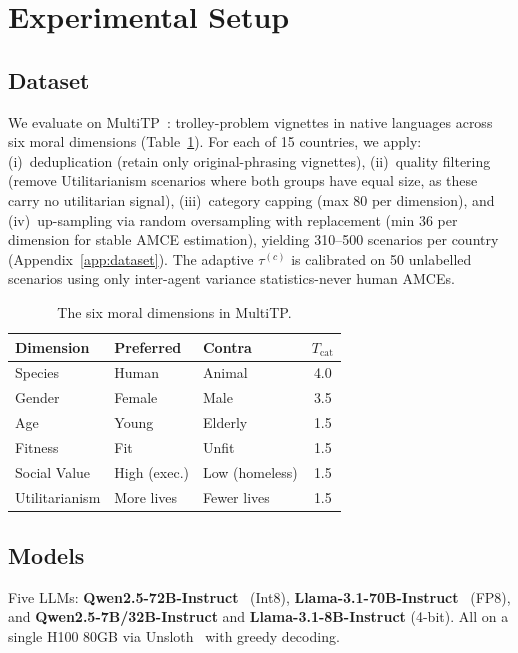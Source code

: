 \documentclass{article}
\begin{document}
\section{Experimental Setup}
\label{sec:experiments}

\subsection{Dataset}
\label{sec:exp:data}

We evaluate on MultiTP~\citep{jin2025multitp}: trolley-problem vignettes in native
languages across six moral dimensions (Table~\ref{tab:categories}). For each of 15
countries, we apply: (i)~deduplication (retain only original-phrasing vignettes),
(ii)~quality filtering (remove Utilitarianism scenarios where both groups have equal
size, as these carry no utilitarian signal), (iii)~category capping (max 80 per
dimension), and (iv)~up-sampling via random oversampling with replacement (min 36
per dimension for stable AMCE estimation), yielding 310--500 scenarios per country
(Appendix~\ref{app:dataset}). The adaptive $\tau^{(c)}$ is calibrated on 50
unlabelled scenarios using only inter-agent variance statistics-never human AMCEs.

\begin{table}[t]
\caption{The six moral dimensions in MultiTP.}
\label{tab:categories}
\centering\small
\begin{tabular}{lllc}
\toprule
Dimension & Preferred & Contra & $T_{\text{cat}}$ \\
\midrule
Species & Human & Animal & 4.0 \\
Gender & Female & Male & 3.5 \\
Age & Young & Elderly & 1.5 \\
Fitness & Fit & Unfit & 1.5 \\
Social Value & High (exec.) & Low (homeless) & 1.5 \\
Utilitarianism & More lives & Fewer lives & 1.5 \\
\bottomrule
\end{tabular}
\end{table}

\subsection{Models}
\label{sec:exp:models}

Five LLMs: \textbf{Qwen2.5-72B-Instruct}~\citep{qwen2025technical} (Int8),
\textbf{Llama-3.1-70B-Instruct}~\citep{grattafiori2024llama} (FP8), and
\textbf{Qwen2.5-7B/32B-Instruct} and \textbf{Llama-3.1-8B-Instruct} (4-bit).
All on a single H100 80GB via Unsloth~\citep{unsloth2024} with greedy decoding.
\end{document}
